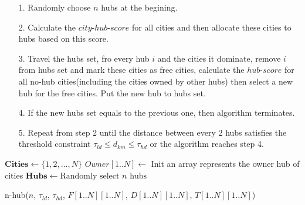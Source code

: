 \documentclass{llncs}
\begin{document}
\begin{itemize}
	\item [1.] Randomly choose $n$ hubs at the begining. 
	\item [2.] Calculate the $city\text{-}hub\text{-}score$ for all cities and then allocate these cities to hubs based on this score.
	\item [3.]  Travel the hubs set, fro every hub $i$ and the cities it dominate, remove $i$ from hubs set and mark these cities as free cities, calculate the  $hub\text{-}score$ for all no-hub cities(including the cities owned by other hubs) then select a new hub for the free cities. Put the new hub to hubs set.
	\item [4.] If the new hubs set equals to the previous one, then algorithm terminates.
	\item[5.] Repeat from step 2 until the distance between every 2 hubs satisfies the threshold constraint $\tau_{ld} \leq d_{km} \leq \tau_{hd}$ or the algorithm reaches step 4.
\end{itemize}
\begin{minipage}[t]{\textwidth}
	\begin{algorithm}[H]
		\BlankLine
		$\mathbf{Cities} \leftarrow \{1,2,...,N\}$\;
		$Owner[1..N] \leftarrow$ Init an array represents the owner hub of cities\;
		$\mathbf{Hubs} \leftarrow \text{Randomly select $n$ hubs}$\;
		\caption{n-hub($n$, $\tau_{ld}$, $\tau_{hd}$, $F[1..N][1..N]$, $D[1..N][1..N]$, $T[1..N][1..N]$)}\label{Alg.n-hub}
	\end{algorithm}
\end{minipage}
\end{document}

